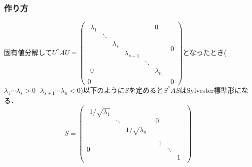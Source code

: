 \subsubsection{作り方}
固有値分解して$U^{\ast}AU=
\left( \begin{array}{c|c}
  \begin{array}{cccccc}
    {\lambda}_1&&&&&0\\
    &\ddots&&&&\\
    &&{\lambda}_s&&&\\
    &&&{\lambda}_{s+1}&&\\
    &&&&\ddots&\\
    0&&&&&{\lambda}_{n}
  \end{array}&0\\\hline
  0&0
\end{array}\right)$となったとき(${\lambda}_1 \cdots {\lambda}_s >0\ \ \ {\lambda}_{s+1}\cdots {\lambda}_n <0$)以下のように$S$を定めると$S^{\ast}AS$はSylvester標準形になる．
\begin{equation}
  S=
  \left( \begin{array}{c|c}
    \begin{array}{ccc}
      1/\sqrt{{\lambda}_1}&&\\
      &\ddots&\\
      &&1/\sqrt{{\lambda}_n}
    \end{array}&0\\\hline
    0&
    \begin{array}{ccc}
      1&&\\
      &\ddots&\\
      &&1
    \end{array}
  \end{array}\right)
\end{equation}
